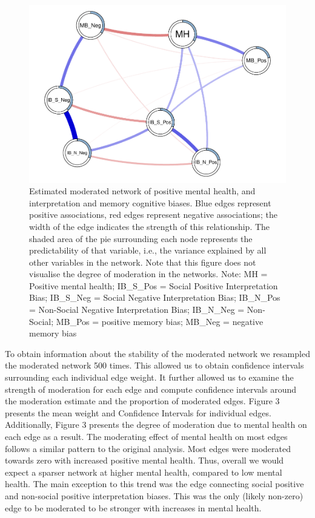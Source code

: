 \documentclass[man,floatsintext]{apa6}
\begin{document}
\begin{figure}
\centering
\includegraphics{CCBH-in-adolescence---Network-analysis_files/figure-latex/unnamed-chunk-3-1.pdf}
\caption{\label{fig:unnamed-chunk-3}Estimated moderated network of positive mental health, and interpretation and memory cognitive biases. Blue edges represent positive associations, red edges represent negative associations; the width of the edge indicates the strength of this relationship. The shaded area of the pie surrounding each node represents the predictability of that variable, i.e., the variance explained by all other variables in the network. Note that this figure does not visualise the degree of moderation in the networks.
Note: MH = Positive mental health; IB\_S\_Pos = Social Positive Interpretation Bias; IB\_S\_Neg = Social Negative Interpretation Bias; IB\_N\_Pos = Non-Social Negative Interpretation Bias; IB\_N\_Neg = Non-Social; MB\_Pos = positive memory bias; MB\_Neg = negative memory bias}
\end{figure}

To obtain information about the stability of the moderated network we resampled the moderated network 500 times. This allowed us to obtain confidence intervals surrounding each individual edge weight. It further allowed us to examine the strength of moderation for each edge and compute confidence intervals around the moderation estimate and the proportion of moderated edges. Figure 3 presents the mean weight and Confidence Intervals for individual edges. Additionally, Figure 3 presents the degree of moderation due to mental health on each edge as a result. The moderating effect of mental health on most edges follows a similar pattern to the original analysis. Most edges were moderated towards zero with increased positive mental health. Thus, overall we would expect a sparser network at higher mental health, compared to low mental health. The main exception to this trend was the edge connecting social positive and non-social positive interpretation biases. This was the only (likely non-zero) edge to be moderated to be stronger with increases in mental health.
\end{document}
